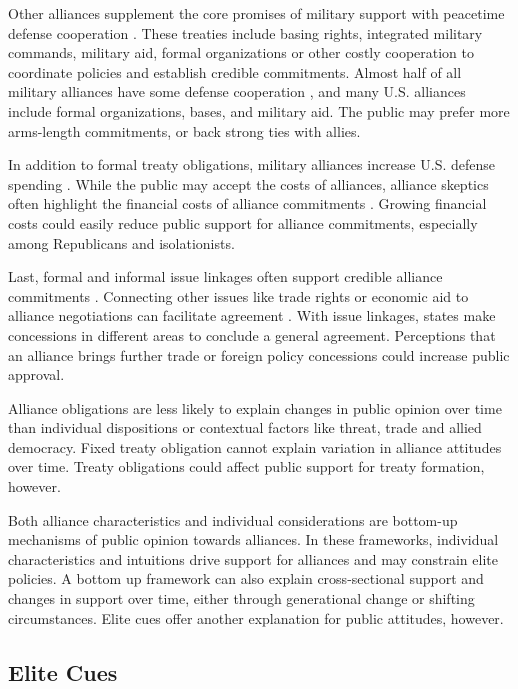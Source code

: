 \documentclass[12pt]{article}
\begin{document}
Other alliances supplement the core promises of military support with peacetime defense cooperation \citep{Morrow1994, LeedsAnac2005}. 
These treaties include basing rights, integrated military commands, military aid, formal organizations or other costly cooperation to coordinate policies and establish credible commitments.
Almost half of all military alliances have some defense cooperation \citep{Leedsetal2002}, and many U.S. alliances include formal organizations, bases, and military aid. 
The public may prefer more arms-length commitments, or back strong ties with allies. 


In addition to formal treaty obligations, military alliances increase U.S. defense spending \citep{AlleyFuhrmann2021}. 
While the public may accept the costs of alliances, alliance skeptics often highlight the financial costs of alliance commitments \citep{Posen2014}. 
Growing financial costs could easily reduce public support for alliance commitments, especially among Republicans and isolationists. 


Last, formal and informal issue linkages often support credible alliance commitments \citep{Poast2013}. 
Connecting other issues like trade rights or economic aid to alliance negotiations can facilitate agreement \citep{Poast2012}.
With issue linkages, states make concessions in different areas to conclude a general agreement. 
Perceptions that an alliance brings further trade or foreign policy concessions could increase public approval.  


Alliance obligations are less likely to explain changes in public opinion over time than individual dispositions or contextual factors like threat, trade and allied democracy. 
Fixed treaty obligation cannot explain variation in alliance attitudes over time. 
Treaty obligations could affect public support for treaty formation, however. 


Both alliance characteristics and individual considerations are bottom-up mechanisms of public opinion towards alliances. 
In these frameworks, individual characteristics and intuitions drive support for alliances and may constrain elite policies. 
A bottom up framework can also explain cross-sectional support and changes in support over time, either through generational change or shifting circumstances. 
Elite cues offer another explanation for public attitudes, however. 



\subsection{Elite Cues} 
\end{document}
